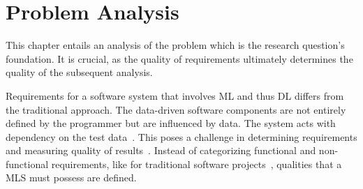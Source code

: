 \chapter{Problem Analysis}\label{ch:problem}
This chapter entails an analysis of the problem which is the research question's foundation.
It is crucial, as the quality of requirements ultimately determines the quality of the
subsequent analysis.

Requirements for a software system that involves \ac{ML} and thus \ac{DL} differs from
the traditional approach. The data-driven software components are not entirely defined by the
programmer but are influenced by data.
The system acts with dependency on the test data~\citep{siebert_construction_2021}.
This poses a challenge in determining requirements and measuring quality of
results~\citep{nakamichi_requirements-driven_2020}.
Instead of categorizing functional and non-functional requirements, like for traditional
software projects~\citep{zowghi_requirements_2014}, qualities that a \ac{MLS} must possess
are defined.

